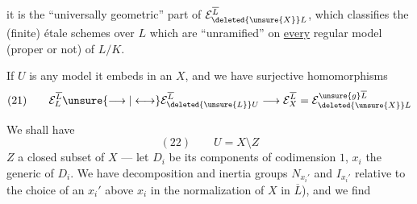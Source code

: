 
it is the ``universally geometric'' part of $\mathcal E_{\deleted{\unsure{X}}L}^{\overline L}$,    which classifies the (finite) étale schemes over $L$ which are ``unramified'' on \uline{every}  regular model (proper or not) of $L/K$.


If $U$ is any model\unsure{,|;} it embeds in an $X$, and we have surjective homomorphisms
\[
(21)\qquad \mathcal E_L^{\overline L}\unsure{\longrightarrow|\longleftrightarrow}\mathcal E_{\deleted{\unsure{L}}U}^{\overline L}\longrightarrow\mathcal E_X^{\overline L}=\mathcal E_{\deleted{\unsure{X}}L}^{\unsure{g}\overline L}
\]

We shall have 
\[
(22)\qquad U=X\setminus Z
\]
$Z$ a closed subset of $X$ --- let $D_i$ be its components of codimension $1$, $x_i$ the generic  of $D_i$. We have decomposition and inertia groups $N_{x_i'}$ and $I_{x_i'}$   relative to the choice of an $x_i'$ above $x_i$ in the normalization of $X$ in $\overline L$), and we find

